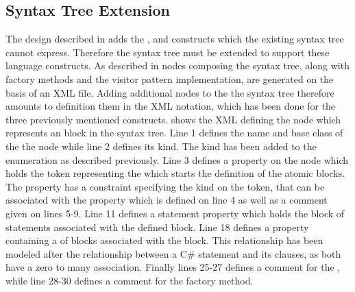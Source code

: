 \subsection{Syntax Tree Extension}
The design described in  adds the ,  and  constructs which the existing syntax tree cannot express. Therefore the syntax tree must be extended to support these language constructs. As described in  nodes composing the syntax tree, along with factory methods and the visitor pattern implementation, are generated on the basis of an \ac{XML} file. Adding additional nodes to the the syntax tree therefore amounts to definition them in the \ac{XML} notation, which has been done for the three previously mentioned constructs.  shows the \ac{XML} defining the  node which represents an  block in the syntax tree. Line 1 defines the name and base class of the the node while line 2 defines its kind. The  kind has been added to the  enumeration as described previously. Line 3 defines a property on the node which holds the token representing the  which starts the definition of the atomic blocks. The property has a constraint specifying the kind on the token, that can be associated with the property which is defined on line 4 as well as a comment given on lines 5-9. Line 11 defines a statement property which holds the block of statements associated with the defined  block. Line 18 defines a property containing a  of  blocks associated with the  block. This relationship has been modeled after the relationship between a C\#  statement and its  clauses, as both have a zero to many association. Finally lines 25-27 defines a comment for the , while line 28-30 defines a comment for the factory method.


